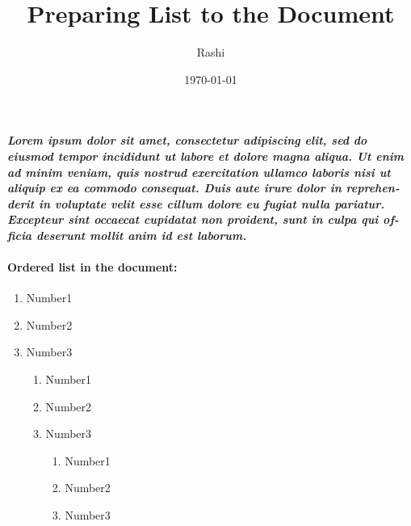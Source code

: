 \documentclass{article}
\begin{document}
	\title{Preparing List to the Document}
	\author{Rashi}
	\date{\today}
	\maketitle
	\textbf{\textit{Lorem ipsum dolor sit amet, consectetur adipiscing elit, sed do
			eiusmod tempor incididunt ut labore et dolore magna aliqua. Ut enim
			ad minim veniam, quis nostrud exercitation ullamco laboris nisi ut
			aliquip ex ea commodo consequat. Duis aute irure dolor in reprehen-
			derit in voluptate velit esse cillum dolore eu fugiat nulla pariatur.
			Excepteur sint occaecat cupidatat non proident, sunt in culpa qui of-
			ficia deserunt mollit anim id est laborum.}}
		\begin{multicols}{2}
		\paragraph{Ordered list in the document:}
		\begin{enumerate}
			\item Number1
			\item Number2
			\item Number3
			\begin{enumerate}[1]
				\item Number1
				\item Number2
				\item Number3
				\begin{enumerate}[i]
					\item Number1
					\item Number2
					\item Number3
				\end{enumerate}
			\end{enumerate}
		\end{enumerate}
		\lipsum[1-2]
	\end{multicols}
\end{document}
